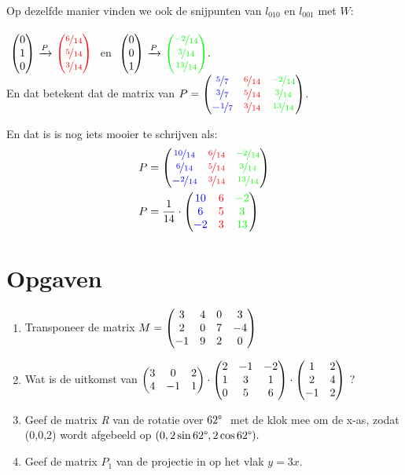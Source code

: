 Op dezelfde manier vinden we ook de snijpunten van $ l_{010} $ en  $ l_{001}  $ met $W$: \\ \\
$ \ \vecdrie{0}{1}{0}   \  \xrightarrow{P}  \  \vecdrie[red]{ \nicefrac{6}{14} }{\nicefrac{5}{14} }{\nicefrac{3}{14} }\ $ 
en \quad  
$  \ \vecdrie{0}{0}{1}   \  \xrightarrow{P}  \ \vecdrie[green]{\nicefrac{-2}{14} }{\nicefrac{3}{14} }{\nicefrac{13}{14}}. $  \\
En dat betekent dat de matrix van 
$ P = \begin{pmatrix}   {\color{blue}\nicefrac{5}{7}} &  {\color{red}\nicefrac{6}{14}} &   {\color{green}\nicefrac{-2}{14}}  \\    {\color{blue}\nicefrac{3}{7}}   &   {\color{red}\nicefrac{5}{14}} &  {\color{green}\nicefrac{3}{14}}  \\   {\color{blue}-\nicefrac{1}{7}} &   {\color{red}\nicefrac{3}{14}}  &   {\color{green}\nicefrac{13}{14}} \end{pmatrix} $.

En dat is is nog iets mooier te schrijven als:
\begin{align*}
P &= \begin{pmatrix}   {\color{blue}\nicefrac{10}{14}} &  {\color{red}\nicefrac{6}{14}} &   {\color{green}\nicefrac{-2}{14}}  \\    {\color{blue}\nicefrac{6}{14}}   &   {\color{red}\nicefrac{5}{14}} &  {\color{green}\nicefrac{3}{14}}  \\   {\color{blue}-\nicefrac{2}{14}} &   {\color{red}\nicefrac{3}{14}}  &   {\color{green}\nicefrac{13}{14}} \end{pmatrix} \\
P &= \frac{1}{14}\cdot \begin{pmatrix}   {\color{blue}10} &  {\color{red}6} &   {\color{green}-2}  \\    {\color{blue}6}   &   {\color{red}5} &  {\color{green}3}  \\   {\color{blue}-2} &   {\color{red}3}  &   {\color{green}13}  \end{pmatrix}
\end{align*}

\newpage
\section{Opgaven}
\begin{enumerate}
	\item Transponeer de matrix 
	$ M = \begin{pmatrix}  3 & 4 & 0 &  3 \\  2 &  0 & 7 & -4 \\ -1 & 9 & 2 & 0  \end{pmatrix} $
	
	\item Wat is de uitkomst van
	$ \begin{pmatrix}  3 & 0 & 2  \\  4 &  -1 & 1 \end{pmatrix} \cdot 
	\begin{pmatrix}  2 & -1 & -2  \\  1 &  3 & 1  \\ 0 & 5 & 6  \end{pmatrix}  \cdot 
	\begin{pmatrix}  1 & 2  \\  2 &  4  \\ -1 & 2  \end{pmatrix} $	? 
	
	\item Geef de matrix  \textit{R } van de rotatie over $ 62\degree \ $ met de klok mee om de x-as, zodat (0,0,2) wordt afgebeeld op $ (0, 2\sin 62\degree , 2\cos 62\degree ). $ \\
	
	\item Geef de matrix  \textit{$ P_1 $} van de projectie  in \RD op het vlak $  y=3x $. \\ \\
	
\end{enumerate}

